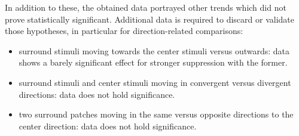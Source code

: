 In addition to these, the obtained data portrayed other trends which did not prove statistically significant. Additional data is required to discard or validate those hypotheses, in particular for direction-related comparisons:

\begin{itemize}
\item surround stimuli moving towards the center stimuli versus outwards: data shows a barely significant effect for stronger suppression with the former.
\item surround stimuli and center stimuli moving in convergent versus divergent directions: data does not hold significance.
\item two surround patches moving in the same versus opposite directions to the center direction: data does not hold significance.
\end{itemize}